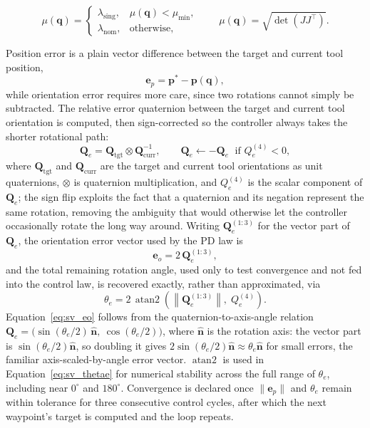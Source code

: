 \begin{equation}
\mu(\mathbf q)=
\begin{cases}
\lambda_{\mathrm{sing}}, & \mu(\mathbf q) < \mu_{\min},\\[0.4ex]
\lambda_{\mathrm{nom}}, & \text{otherwise},
\end{cases}
\qquad
\mu(\mathbf q)=\sqrt{\det\!\left(JJ^{\top}\right)}.
\label{lambda_switch}
\end{equation}


Position error is a plain vector difference between the target and current tool position,
\begin{equation}
\mathbf{e}_p = \mathbf{p}^* - \mathbf{p}(\mathbf{q}),
\label{eq:sv_poserror}
\end{equation}
while orientation error requires more care, since two rotations cannot simply be subtracted. The
relative error quaternion between the target and current tool orientation is computed, then
sign-corrected so the controller always takes the shorter rotational path:
\begin{equation}
\mathbf{Q}_e = \mathbf{Q}_{\text{tgt}} \otimes \mathbf{Q}_{\text{curr}}^{-1}, \qquad
\mathbf{Q}_e \leftarrow -\mathbf{Q}_e \;\text{ if } Q_e^{(4)} < 0,
\label{eq:sv_quaterr}
\end{equation}
where $\mathbf{Q}_{\text{tgt}}$ and $\mathbf{Q}_{\text{curr}}$ are the target and current tool
orientations as unit quaternions, $\otimes$ is quaternion multiplication, and $Q_e^{(4)}$ is the
scalar component of $\mathbf{Q}_e$; the sign flip exploits the fact that a quaternion and its
negation represent the same rotation, removing the ambiguity that would otherwise let the
controller occasionally rotate the long way around. Writing $\mathbf{Q}_e^{(1:3)}$ for the vector
part of $\mathbf{Q}_e$, the orientation error vector used by the PD law is
\begin{equation}
\mathbf{e}_o = 2\,\mathbf{Q}_e^{(1:3)},
\label{eq:sv_eo}
\end{equation}
and the total remaining rotation angle, used only to test convergence and not fed into the control
law, is recovered exactly, rather than approximated, via
\begin{equation}
\theta_e = 2\,\operatorname{atan2}\!\left( \left\lVert \mathbf{Q}_e^{(1:3)} \right\rVert,\; Q_e^{(4)} \right).
\label{eq:sv_thetae}
\end{equation}
Equation~\eqref{eq:sv_eo} follows from the quaternion-to-axis-angle relation
$\mathbf{Q}_e = \big( \sin(\theta_e/2)\,\hat{\mathbf{n}},\ \cos(\theta_e/2) \big)$, where
$\hat{\mathbf{n}}$ is the rotation axis: the vector part is $\sin(\theta_e/2)\hat{\mathbf{n}}$, so
doubling it gives $2\sin(\theta_e/2)\hat{\mathbf{n}} \approx \theta_e \hat{\mathbf{n}}$ for small
errors, the familiar axis-scaled-by-angle error vector. $\operatorname{atan2}$ is used in
Equation~\eqref{eq:sv_thetae} for numerical stability across the full range of $\theta_e$, including
near $0^\circ$ and $180^\circ$. Convergence is declared once $\lVert \mathbf{e}_p \rVert$ and
$\theta_e$ remain within tolerance for three consecutive control cycles, after which the next
waypoint's target is computed and the loop repeats.

